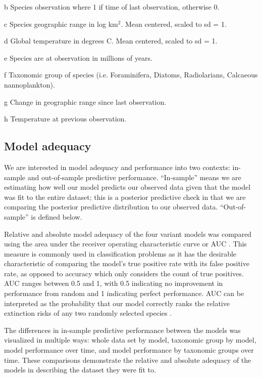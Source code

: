 \documentclass[12pt,letterpaper]{article}
\begin{document}
\begin{table}[ht]
\begin{threeparttable}
\begin{tablenotes}
    \item[b] Species observation where 1 if time of last observation, otherwise 0.
    \item[c] Species geographic range in log km\(^2\). Mean centered, scaled to sd = 1.
    \item[d] Global temperature in degrees C. Mean centered, scaled to sd = 1.
    \item[e] Species are at observation in millions of years.
    \item[f] Taxonomic group of species (i.e. Foraminifera, Diatoms, Radiolarians, Calcaeous nannoplankton).
    \item[g] Change in geographic range since last observation.
    \item[h] Temperature at previous observation.
    \end{tablenotes}
  \end{threeparttable}
  \label{tab:model_def}
\end{table}


\subsection{Model adequacy}

We are interested in model adequacy and performance into two contexts: in-sample and out-of-sample predictive performance. ``In-sample'' means we are estimating how well our model predicts our observed data given that the model was fit to the entire dataset; this is a posterior predictive check in that we are comparing the posterior predictive distribution to our observed data. ``Out-of-sample'' is defined below.

Relative and absolute model adequacy of the four variant models was compared using the area under the receiver operating characteristic curve or AUC \citep{Fawcett2006,Mason2002}. This measure is commonly used in classification problems as it has the desirable characteristic of comparing the model's true positive rate with its false positive rate, as opposed to accuracy which only considers the count of true positives. AUC ranges between 0.5 and 1, with 0.5 indicating no improvement in performance from random and 1 indicating perfect performance. AUC can be interpreted as the probability that our model correctly ranks the relative extinction risks of any two randomly selected species \citep{Fawcett2006,Mason2002}.

The differences in in-sample predictive performance between the models was visualized in multiple ways: whole data set by model, taxonomic group by model, model performance over time, and model performance by taxonomic groups over time. These comparisons demonstrate the relative and absolute adequacy of the models in describing the dataset they were fit to.
\end{document}
